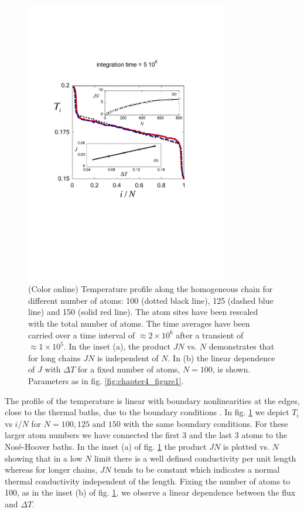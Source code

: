 \begin{figure}
\centering
\includegraphics[width=8.8cm]{Figures/FIG3.pdf}
\caption{(Color online) Temperature profile along the homogeneous chain for different number of atoms: 100 (dotted black line), 125 (dashed blue line) and 150 (solid red line). The atom sites have been rescaled with the total number of atoms.
The time averages have been carried over a time interval of $\approx 2 \times 10^6$ after a transient of $\approx 1\times 10^5$. In the inset (a), the product $JN$ vs. $N$ demonstrates that for long chains $JN$ is independent of $N$. In (b) the linear dependence of $J$ with $\Delta T$ for a fixed number of atoms, $N=100$, is shown. Parameters as in fig. \ref{fig:chapter4_figure1}.}
\label{fig:chapter4_figure3}
\end{figure}

The profile of the temperature is linear with boundary nonlinearities at the edges, close to the thermal baths,  due to the boundary conditions \cite{Lepri1997}. In fig. \ref{fig:chapter4_figure3} we depict $T_i$ vs $i/N$ for $N=100, 125$ and $150$ with the same boundary conditions. For these
larger atom numbers  we have connected the first 3 and the last 3 atoms to the Nos\'e-Hoover baths.
In the inset (a) of fig. \ref{fig:chapter4_figure3}  the product $JN$ is plotted vs. $N$ showing that in a low $N$ limit there is a well defined conductivity per unit length whereas for longer chains, $JN$ tends to be constant  which indicates a normal thermal conductivity independent of the length. Fixing the number of atoms to 100, as in the inset (b) of fig. \ref{fig:chapter4_figure3},  we observe a linear dependence between the flux and $\Delta T$.

